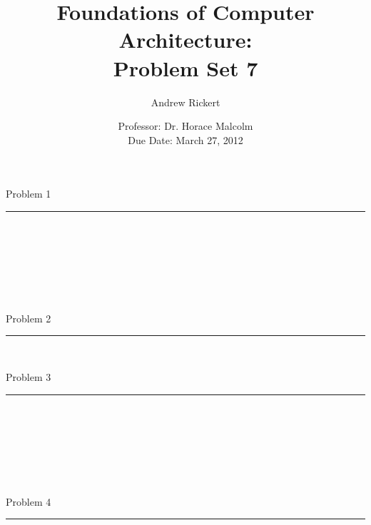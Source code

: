 \documentclass[11pt,reqno]{article}
\title{Foundations of Computer Architecture: \\ Problem Set 7 }
\author{Andrew Rickert}
\date{Professor: Dr. Horace Malcolm \\ \hspace{-33pt} Due Date: March 27,  2012}                                           %
\begin{document}
\maketitle


\begin{flushleft} 
Problem 1 \\
\rule{500pt}{1pt}\\
\end{flushleft} 


\noindent{}\\ 


\noindent{}\\ 


\noindent{}\\ 


\noindent{}\\ 


\begin{flushleft} 
Problem 2 \\
\rule{500pt}{1pt}\\
\end{flushleft} 



\begin{flushleft} 
Problem 3 \\
\rule{500pt}{1pt}\\
\end{flushleft} 

\noindent{}\\ 


\noindent{}\\ 


\noindent{}\\ 


\noindent{}\\ 

\begin{flushleft} 
Problem 4 \\
\rule{500pt}{1pt}\\
\end{flushleft} 
\end{document}
